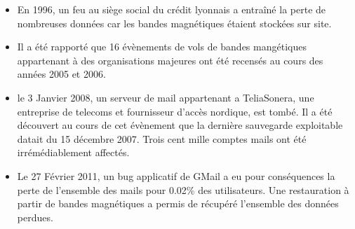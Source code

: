 \documentclass[a4paper,11pt]{report}
\begin{document}
\begin{itemize}
\item En 1996, un feu au siège social du crédit lyonnais a entraîné la perte de nombreuses données car les bandes magnétiques étaient stockées sur site.
\item Il a été rapporté que 16 évènements de vols de bandes mangétiques appartenant à des organisations majeures ont été recensés au cours des années 2005 et 2006.
\item le 3 Janvier 2008, un serveur de mail appartenant a TeliaSonera, une entreprise de telecoms et fournisseur d'accès nordique, est tombé. Il a été découvert au cours de cet évènement que la dernière sauvegarde exploitable datait du 15 décembre 2007. Trois cent mille comptes mails ont été irrémédiablement affectés. 
\item Le 27 Février 2011, un bug applicatif de GMail a eu pour conséquences la perte de l'ensemble des mails pour 0.02\% des utilisateurs. Une restauration à partir de bandes magnétiques a permis de récupéré l'ensemble des données perdues.
\end{itemize}

\begin{abstract}
\end{abstract}
\end{document}
